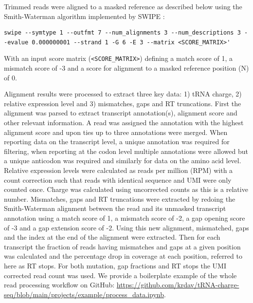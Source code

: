 \documentclass[9pt,lineno]{elife}
\begin{document}
Trimmed reads were aligned to a masked reference as described below using the Smith-Waterman algorithm implemented by SWIPE \citep{Rognes2011-iu}:
\begin{lstlisting}
swipe --symtype 1 --outfmt 7 --num_alignments 3 --num_descriptions 3 --evalue 0.000000001 --strand 1 -G 6 -E 3 --matrix <SCORE_MATRIX>'
\end{lstlisting}
With an input score matrix (\verb|<SCORE_MATRIX>|) defining a match score of 1, a mismatch score of -3 and a score for alignment to a masked reference position (N) of 0.

Alignment results were processed to extract three key data: 1) tRNA charge, 2) relative expression level and 3) mismatches, gaps and RT truncations.
First the alignment was parsed to extract transcript annotation(s), alignment score and other relevant information.
A read was assigned the annotation with the highest alignment score and upon ties up to three annotations were merged.
When reporting data on the transcript level, a unique annotation was required for filtering, when reporting at the codon level multiple annotations were allowed but a unique anticodon was required and similarly for data on the amino acid level.
Relative expression levels were calculated as reads per million (RPM) with a count correction such that reads with identical sequence and UMI were only counted once.
Charge was calculated using uncorrected counts as this is a relative number.
Mismatches, gaps and RT truncations were extracted by redoing the Smith-Waterman alignment between the read and its unmasked transcript annotation using a match score of 1, a mismatch score of -2, a gap opening score of -3 and a gap extension score of -2.
Using this new alignment, mismatched, gaps and the index at the end of the alignment were extracted.
Then for each transcript the fraction of reads having mismatches and gaps at a given position was calculated and the percentage drop in coverage at each position, referred to here as RT stops.
For both mutation, gap fractions and RT stops the UMI corrected read count was used.
We provide a boilerplate example of the whole read processing workflow on GitHub: \url{https://github.com/krdav/tRNA-charge-seq/blob/main/projects/example/process_data.ipynb}.
\end{document}
